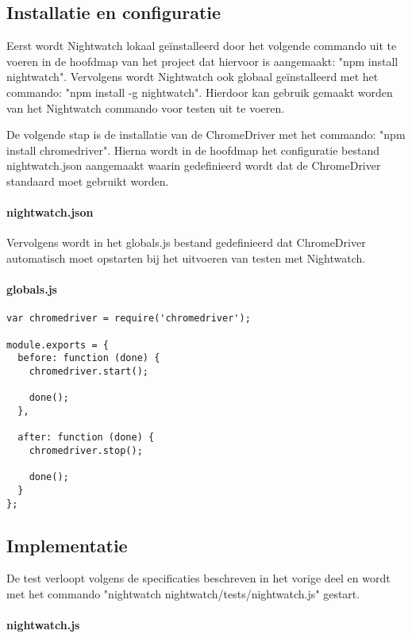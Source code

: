 \subsection{Installatie en configuratie}
Eerst wordt Nightwatch lokaal geïnstalleerd door het volgende commando uit te voeren in de hoofdmap van het project dat hiervoor is aangemaakt: "npm install nightwatch". Vervolgens wordt Nightwatch ook globaal geïnstalleerd met het commando: "npm install -g nightwatch". Hierdoor kan gebruik gemaakt worden van het Nightwatch commando voor testen uit te voeren.

De volgende stap is de installatie van de ChromeDriver met het commando: "npm install chromedriver". Hierna wordt in de hoofdmap het configuratie bestand nightwatch.json aangemaakt waarin gedefinieerd wordt dat de ChromeDriver standaard moet gebruikt worden.

\paragraph{nightwatch.json}


Vervolgens wordt in het globals.js bestand gedefinieerd dat ChromeDriver automatisch moet opstarten bij het uitvoeren van testen met Nightwatch. 

\paragraph{globals.js}
\begin{lstlisting}[breaklines=true]
var chromedriver = require('chromedriver');

module.exports = {
  before: function (done) {
    chromedriver.start();

    done();
  },

  after: function (done) {
    chromedriver.stop();

    done();
  }
};  
\end{lstlisting}

\subsection{Implementatie}
De test verloopt volgens de specificaties beschreven in het vorige deel en wordt met het commando "nightwatch nightwatch/tests/nightwatch.js" gestart.

\paragraph{nightwatch.js}

